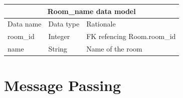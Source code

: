 \documentclass{sig-alt-release2}
\begin{document}
\begin{tabular}{| p{1.8cm} | p{1cm} | p{4.2cm}|}
\hline
\multicolumn{3}{|c|}{\textbf{Room\_name data model}} \\
\hline
Data name & Data type & Rationale \\
\hline
room\_id & Integer & FK refencing Room.room\_id \\
\hline
name & String & Name of the room \\
\hline
\end{tabular}	



\section{Message Passing}
\end{document}
